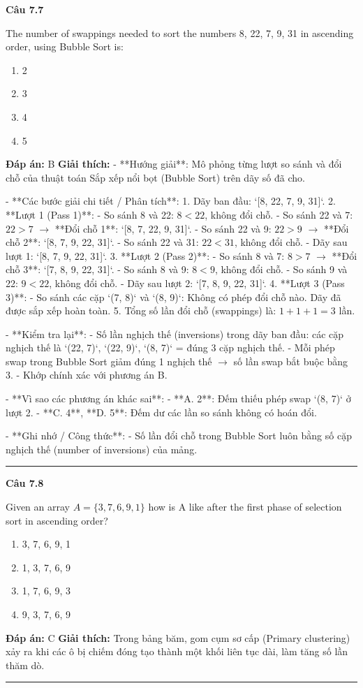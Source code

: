 \documentclass[11pt,a4paper]{article}
\newenvironment{question}[1]{%
  \par\vspace{1em}\noindent\textbf{\large Câu #1}\par\vspace{0.4em}
}{%
  \par\vspace{1em}\hrule\vspace{0.6em}
}
\newenvironment{choices}{%
  \begin{enumerate}[label=\textbf{\Alph*.},leftmargin=2.2em,itemsep=2pt,topsep=3pt]
}{%
  \end{enumerate}
}
\newcommand{\choice}{\item}
\begin{document}
\begin{question}{7.7}
The number of swappings needed to sort the numbers 8, 22, 7, 9, 31 in ascending order, using Bubble Sort is:
\begin{choices}
\choice 2
\choice 3
\choice 4
\choice 5
\end{choices}
\textbf{Đáp án:} B
\textbf{Giải thích:} - **Hướng giải**:
  Mô phỏng từng lượt so sánh và đổi chỗ của thuật toán Sắp xếp nổi bọt (Bubble Sort) trên dãy số đã cho.

- **Các bước giải chi tiết / Phân tích**:
  1. Dãy ban đầu: `[8, 22, 7, 9, 31]`.
  2. **Lượt 1 (Pass 1)**:
     - So sánh 8 và 22: \(8 < 22\), không đổi chỗ.
     - So sánh 22 và 7: \(22 > 7\) \(\rightarrow\) **Đổi chỗ 1**: `[8, 7, 22, 9, 31]`.
     - So sánh 22 và 9: \(22 > 9\) \(\rightarrow\) **Đổi chỗ 2**: `[8, 7, 9, 22, 31]`.
     - So sánh 22 và 31: \(22 < 31\), không đổi chỗ.
     - Dãy sau lượt 1: `[8, 7, 9, 22, 31]`.
  3. **Lượt 2 (Pass 2)**:
     - So sánh 8 và 7: \(8 > 7\) \(\rightarrow\) **Đổi chỗ 3**: `[7, 8, 9, 22, 31]`.
     - So sánh 8 và 9: \(8 < 9\), không đổi chỗ.
     - So sánh 9 và 22: \(9 < 22\), không đổi chỗ.
     - Dãy sau lượt 2: `[7, 8, 9, 22, 31]`.
  4. **Lượt 3 (Pass 3)**:
     - So sánh các cặp `(7, 8)` và `(8, 9)`: Không có phép đổi chỗ nào. Dãy đã được sắp xếp hoàn toàn.
  5. Tổng số lần đổi chỗ (swappings) là: \(1 + 1 + 1 = 3\) lần.

- **Kiểm tra lại**:
  - Số lần nghịch thế (inversions) trong dãy ban đầu: các cặp nghịch thế là `(22, 7)`, `(22, 9)`, `(8, 7)` = đúng 3 cặp nghịch thế.
  - Mỗi phép swap trong Bubble Sort giảm đúng 1 nghịch thế \(\rightarrow\) số lần swap bắt buộc bằng 3.
  - Khớp chính xác với phương án B.

- **Vì sao các phương án khác sai**:
  - **A. 2**: Đếm thiếu phép swap `(8, 7)` ở lượt 2.
  - **C. 4**, **D. 5**: Đếm dư các lần so sánh không có hoán đổi.

- **Ghi nhớ / Công thức**:
  - Số lần đổi chỗ trong Bubble Sort luôn bằng số cặp nghịch thế (number of inversions) của mảng.
\end{question}

\begin{question}{7.8}
Given an array \(A = \{3, 7, 6, 9, 1\}\) how is A like after the first phase of selection sort in ascending order?
\begin{choices}
\choice 3, 7, 6, 9, 1
\choice 1, 3, 7, 6, 9
\choice 1, 7, 6, 9, 3
\choice 9, 3, 7, 6, 9
\end{choices}
\textbf{Đáp án:} C
\textbf{Giải thích:} Trong bảng băm, gom cụm sơ cấp (Primary clustering) xảy ra khi các ô bị chiếm đóng tạo thành một khối liên tục dài, làm tăng số lần thăm dò.
\end{question}
\end{document}
